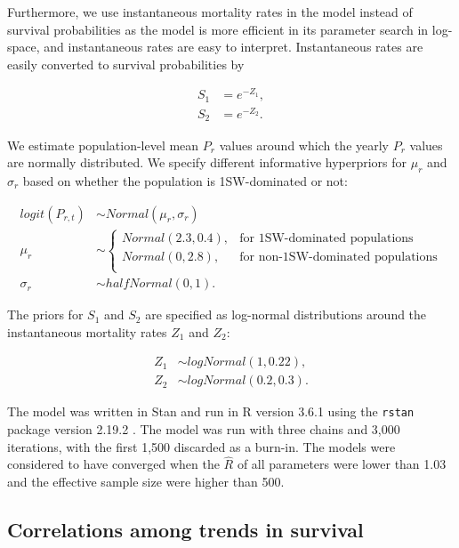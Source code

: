 \documentclass[12pt]{article}
\newcommand{\So}{$S_{1}$\xspace}
\newcommand{\St}{$S_{2}$\xspace}
\newcommand{\Pg}{$P_r$\xspace}
\newcommand{\prmu}{$\mu_r$\xspace}
\newcommand{\prsig}{$\sigma_r$\xspace}
\begin{document}
Furthermore, we use instantaneous mortality rates in the model instead of survival probabilities
as the model is more efficient in its parameter search in log-space, and instantaneous rates
are easy to interpret. Instantaneous rates are easily converted to survival probabilities by 

\begin{align}
 S_{1} &= e^{-Z_1}, \\
 S_{2} &= e^{-Z_2}. 
\end{align}

We estimate population-level mean \Pg values around which the yearly \Pg
values are normally distributed. We specify different informative hyperpriors
for \prmu and \prsig based on whether the population is 1SW-dominated or not:

\begin{align}
    logit(P_{r,t}) &\sim Normal(\mu_r, \sigma_r) \\
    \mu_r &\sim 
    \begin{cases}
       Normal(2.3, 0.4),  &\text{for 1SW-dominated populations} \\
       Normal(0, 2.8), &\text{for non-1SW-dominated populations} \\
   \end{cases} \\
    \sigma_r &\sim halfNormal(0, 1).
\end{align}

The priors for \So and \St are specified as log-normal distributions around
the instantaneous mortality rates $Z_1$ and $Z_2$:

\begin{align}
Z_1 &\sim logNormal(1, 0.22),   \\ 
Z_2 &\sim logNormal(0.2, 0.3).
\end{align}

The model was written in Stan \citep{Carpenter2017} and run in R version 3.6.1
\citep{RCoreTeam2019} using the \texttt{rstan} package version 2.19.2
\citep{StanDevelopmentTeam2019}.
The model was run with three chains and 3,000 iterations, with the first 1,500
discarded as a burn-in. The models were considered to have converged when the
$\hat R$ of all parameters were lower than 1.03 and the effective sample size 
were higher than 500.

\subsection*{Correlations among trends in survival}
\end{document}
